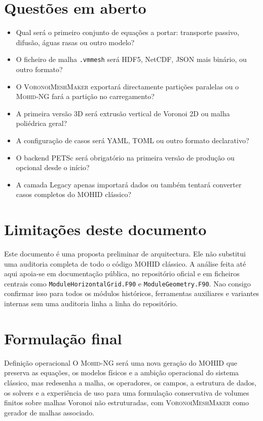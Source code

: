 \documentclass[11pt,a4paper]{article}
\newcommand{\mohidng}{\textsc{Mohid-NG}}
\newcommand{\vmm}{\textsc{VoronoiMeshMaker}}
\begin{document}
\section{Questões em aberto}

\begin{itemize}
\item Qual será o primeiro conjunto de equações a portar: transporte passivo, difusão, águas rasas ou outro modelo?
\item O ficheiro de malha \texttt{.vmmesh} será HDF5, NetCDF, JSON mais binário, ou outro formato?
\item O \vmm{} exportará directamente partições paralelas ou o \mohidng{} fará a partição no carregamento?
\item A primeira versão 3D será extrusão vertical de Voronoi 2D ou malha poliédrica geral?
\item A configuração de casos será YAML, TOML ou outro formato declarativo?
\item O backend PETSc será obrigatório na primeira versão de produção ou opcional desde o início?
\item A camada Legacy apenas importará dados ou também tentará converter casos completos do MOHID clássico?
\end{itemize}

\section{Limitações deste documento}

Este documento é uma proposta preliminar de arquitectura. Ele não substitui uma auditoria completa de todo o código MOHID clássico. A análise feita até aqui apoia-se em documentação pública, no repositório oficial e em ficheiros centrais como \texttt{ModuleHorizontalGrid.F90} e \texttt{ModuleGeometry.F90}. Nao consigo confirmar isso para todos os módulos históricos, ferramentas auxiliares e variantes internas sem uma auditoria linha a linha do repositório.

\section{Formulação final}

\begin{principlebox}{Definição operacional}
O \mohidng{} será uma nova geração do MOHID que preserva as equações, os modelos físicos e a ambição operacional do sistema clássico, mas redesenha a malha, os operadores, os campos, a estrutura de dados, os solvers e a experiência de uso para uma formulação conservativa de volumes finitos sobre malhas Voronoi não estruturadas, com \vmm{} como gerador de malhas associado.
\end{principlebox}
\end{document}

